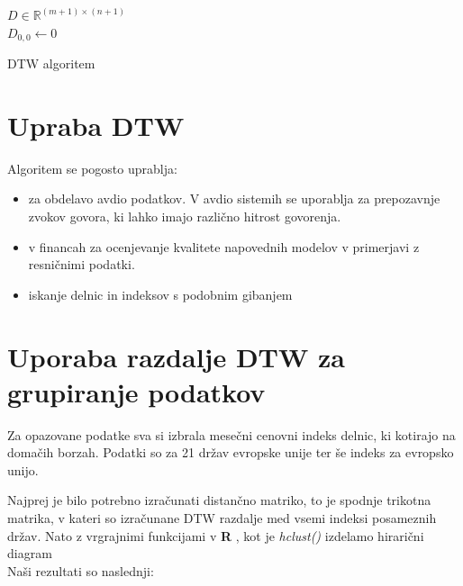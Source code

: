 \documentclass[12pt,a4paper]{article}
\newcommand{\R}{\mathbb R}
\begin{document}
\begin{algorithm}[H]

    \SetAlgoLined
     \BlankLine
     $D \in \R^{(m+1)\times(n+1)}$\\ 
     $D_{0,0} \leftarrow 0$ \\
     \caption{DTW algoritem}
    \end{algorithm}

\section{Upraba DTW}
Algoritem se pogosto uprablja:
\begin{itemize}
    \item za obdelavo avdio podatkov. V avdio sistemih se uporablja za prepozavnje zvokov govora, ki lahko imajo različno hitrost govorenja.  
    \item v financah za ocenjevanje kvalitete napovednih modelov v primerjavi z resničnimi podatki. 
    \item iskanje delnic in indeksov s  podobnim gibanjem
\end{itemize}

\section{Uporaba razdalje DTW za grupiranje podatkov}
Za opazovane podatke sva si izbrala mesečni cenovni indeks delnic, ki 
kotirajo na domačih borzah. Podatki so za 21 držav evropske unije ter še 
indeks za evropsko unijo.

Najprej je bilo potrebno izračunati distančno matriko, to je spodnje trikotna matrika,
v kateri so izračunane DTW razdalje med vsemi indeksi posameznih držav.
Nato z vrgrajnimi funkcijami v \textbf{R} , kot je \emph{hclust()} izdelamo hirarični diagram
\\
Naši rezultati so naslednji:
\\
\end{document}
